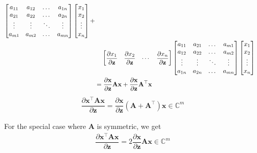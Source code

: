 \documentclass{article}
\newcommand{\trans}{\top}
\begin{document}
\begin{align}
\begin{bmatrix}
        a_{11} & a_{12} & \dots & a_{1n} \\
        a_{21} & a_{22} & \dots & a_{2n} \\
        \vdots & \vdots & \ddots & \vdots \\
        a_{m1} & a_{m2} & \dots & a_{mn} \\
    \end{bmatrix}
    \begin{bmatrix}
        x_{1} \\ x_{2} \\ \vdots \\ x_{n}
    \end{bmatrix} + \nonumber \\
    & \hspace{2.5ex} \begin{bmatrix}
        \dfrac{\partial x_{1}}{\partial \mathbf{z}} & \dfrac{\partial x_{2}}{\partial \mathbf{z}} & \cdots  & \dfrac{\partial x_{n}}{\partial \mathbf{z}}
     \end{bmatrix}
     \begin{bmatrix}
         a_{11} & a_{21} & \dots & a_{m1} \\
         a_{12} & a_{22} & \dots & a_{m2} \\
         \vdots & \vdots & \ddots & \vdots \\
         a_{1n} & a_{2n} & \dots & a_{mn} \\
     \end{bmatrix}
     \begin{bmatrix}
         x_{1} \\ x_{2} \\ \vdots \\ x_{n}
     \end{bmatrix} \\
     & = \dfrac{\partial \mathbf{x}}{\partial \mathbf{z}}\mathbf{A} \mathbf{x} + \dfrac{\partial \mathbf{x}}{\partial \mathbf{z}}\mathbf{A}^\trans \mathbf{x}
\end{align}
\begin{align}
    \boxed{\dfrac{\partial \mathbf{x}^\trans \mathbf{A} \mathbf{x}}{\partial \mathbf{z}} = \dfrac{\partial \mathbf{x}}{\partial \mathbf{z}}\left( \mathbf{A} + \mathbf{A}^\trans \right) \mathbf{x} \in \mathbb{C}^{m}}
\end{align}

For the special case where \(\mathbf{A}\) is symmetric, we get
\begin{align}
    \boxed{\dfrac{\partial \mathbf{x}^\trans \mathbf{A} \mathbf{x}}{\partial \mathbf{z}} = 2\dfrac{\partial \mathbf{x}}{\partial \mathbf{z}}\mathbf{A} \mathbf{x} \in \mathbb{C}^{m}}
\end{align}
\end{document}
